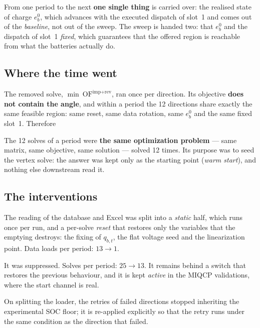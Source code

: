 \documentclass[11pt,a4paper]{article}
\newcommand{\nw}[1]{\textcolor{uaired}{#1}}
\begin{document}
\vspace{6pt}

From one period to the next \textbf{one single thing} is carried over: the realised state of charge
$e_{b}^{0}$, which advances with the executed dispatch of slot~1 and comes out of the
\emph{baseline}, not out of the sweep. The sweep is handed two: that $e_b^0$ and the dispatch of
slot~1 \emph{fixed}, which guarantees that the offered region is reachable from what the batteries
actually do.

\subsection{Where the time went}

The removed solve, $\min\ \mathrm{OF}^{\text{imp}+\text{rev}}$, ran once per direction.
Its objective \textbf{does not contain the angle}, and within a period the 12 directions share
exactly the same feasible region: same reset, same data rotation, same $e_b^0$ and the same fixed
slot~1. Therefore

\begin{keybox}
The 12 solves of a period were \textbf{the same optimization problem} --- same matrix, same
objective, same solution --- solved 12 times. Its purpose was to seed the vertex solve: the answer
was kept only as the starting point (\emph{warm start}), and nothing else downstream read it.
\end{keybox}

\subsection{The interventions}

\begin{description}[leftmargin=1.6em,itemsep=3pt,topsep=3pt]
  \item[\nw{(E)} Splitting the loader.] The reading of the database and Excel was split into a
  \emph{static} half, which runs once per run, and a per-solve \emph{reset} that restores only the
  variables that the emptying destroys: the fixing of $q_{b,t}$, the flat voltage seed and the
  linearization point. Data loads per period: $13 \rightarrow 1$.
  \item[\nw{(A)} Removal of the per-direction warm-start solve.] It was suppressed. Solves per
  period: $25 \rightarrow 13$. It remains behind a switch that restores the previous behaviour, and
  it is kept \emph{active} in the MIQCP validations, where the start channel is real.
  \item[\nw{(C)} Fix in the diagnostic passes.] On splitting the loader, the retries of failed
  directions stopped inheriting the experimental SOC floor; it is re-applied explicitly so that the
  retry runs under the same condition as the direction that failed.
\end{description}
\end{document}
